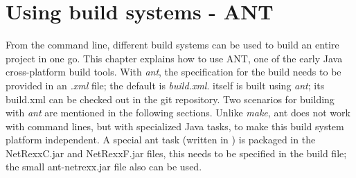 





\chapter{Using build systems - ANT}

From the command line, different build systems can be used to build an
entire project in one go. This chapter explains how to use ANT, one of
the early Java cross-platform build tools. With \emph{ant}, the
specification for the build needs to be provided in an \emph{.xml} file; the
default is \emph{build.xml}. \nr{} itself is built using \emph{ant};
its build.xml can be checked out in the git repository. Two scenarios
for building with \emph{ant} are mentioned in the
following sections. Unlike \emph{make}, ant does not work with command
lines, but with specialized Java tasks, to make this build system
platform independent. A special \nr{} ant task (written in \nr{}) is packaged in the
NetRexxC.jar and NetRexxF.jar files, this needs to be specified in the
build file; the small ant-netrexx.jar file also can be used.

